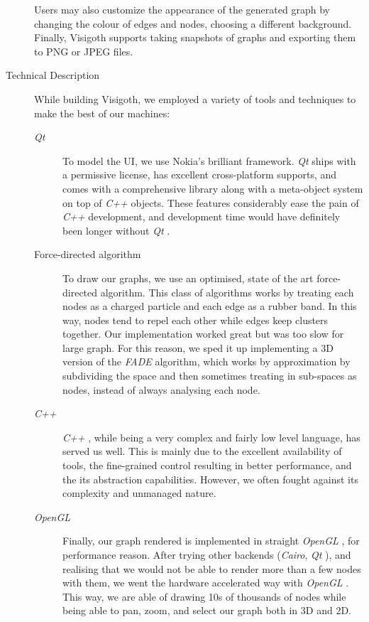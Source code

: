 \documentclass[a4paper,11pt]{article}
\newcommand{\buzz}[1]{\emph{#1}}
\newcommand{\Qt}{\buzz{Qt} }
\newcommand{\Cpp}{\buzz{C++} }
\newcommand{\OpenGL}{\buzz{OpenGL} }
\newcommand{\FADE}{\buzz{FADE} }
\begin{document}
\begin{description}
  Users may also customize the appearance of the generated graph by
  changing the colour of edges and nodes, choosing a different
  background. Finally, Visigoth supports taking snapshots of graphs
  and exporting them to PNG or JPEG files.

\item[Technical Description]

  While building Visigoth, we employed a variety of tools and techniques to make
  the best of our machines:

  \begin{description}
    \item[\Qt] To model the UI, we use Nokia's brilliant framework. \Qt
      ships with a permissive license, has excellent cross-platform supports,
      and comes with a comprehensive library along with a meta-object system on
      top of \Cpp objects. These features considerably ease the pain of \Cpp
      development, and development time would have definitely been longer
      without \Qt.

    \item[Force-directed algorithm] To draw our graphs, we use an optimised,
      state of the art force-directed algorithm. This class of algorithms works
      by treating each nodes as a charged particle and each edge as a rubber
      band. In this way, nodes tend to repel each other while edges keep
      clusters together. Our implementation worked great but was too slow for
      large graph. For this reason, we sped it up implementing a 3D version of
      the \FADE algorithm, which works by approximation by subdividing the space
      and then sometimes treating in sub-spaces as nodes, instead of always
      analysing each node.

    \item[\Cpp] \Cpp, while being a very complex and fairly low level language,
      has served us well. This is mainly due to the excellent availability of
      tools, the fine-grained control resulting in better performance, and the
      its abstraction capabilities. However, we often fought against its
      complexity and unmanaged nature.

    \item[\OpenGL] Finally, our graph rendered is implemented in straight
      \OpenGL, for performance reason. After trying other backends
      (\buzz{Cairo}, \Qt), and realising that we would not be able to render
      more than a few nodes with them, we went the hardware accelerated way with
      \OpenGL. This way, we are able of drawing 10s of thousands of nodes while
      being able to pan, zoom, and select our graph both in 3D and 2D.
  \end{description}


\end{description}
\end{document}

